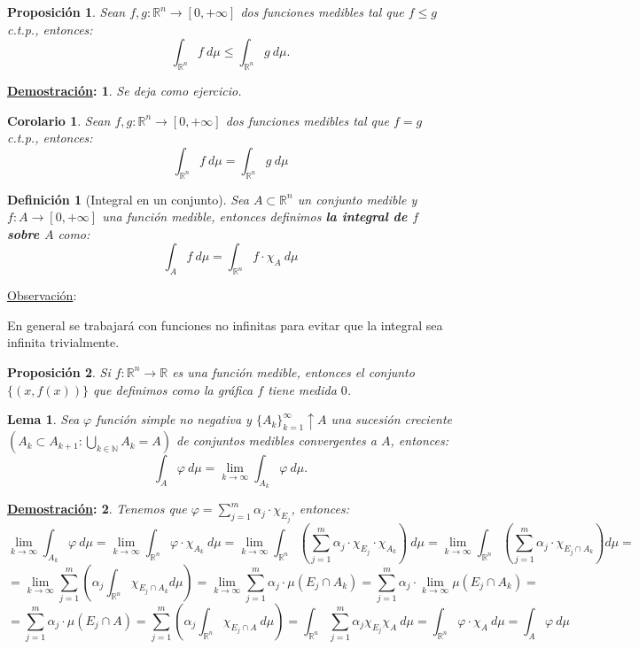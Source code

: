 \documentclass[10pt,a4paper,openright]{book}
\theoremstyle{break}
\newtheorem*{defi}{Definición}
\newtheorem*{coro}{Corolario}
\newtheorem*{lema}{Lema}
\newtheorem*{prop}{Proposición}
\newtheorem*{demo}{\underline{Demostración}:}
\begin{document}
\begin{prop}
Sean $f, g: \mathbb{R}^n \rightarrow \left[0, +\infty\right]$ dos funciones medibles tal que $f \le g$ c.t.p., entonces:
$$\int_{\mathbb{R}^n}f \ d \mu \le \int_{\mathbb{R}^n}g \ d \mu.$$
\end{prop}
\begin{demo}
Se deja como ejercicio.
\end{demo}

\begin{coro}
Sean $f, g: \mathbb{R}^n \rightarrow \left[0, +\infty\right]$ dos funciones medibles tal que $f = g$ c.t.p., entonces:
$$\int_{\mathbb{R}^n}f \ d \mu = \int_{\mathbb{R}^n} g \ d \mu$$
\end{coro}

\begin{defi}[Integral en un conjunto]
Sea $A \subset \mathbb{R}^n$ un conjunto medible y $f: A \rightarrow \left[0, +\infty\right]$ una función medible, entonces definimos \textbf{la integral de $f$ sobre $A$} como:
$$\int_A f \ d \mu = \int_{\mathbb{R}^n}f \cdot \chi_{A} \ d \mu$$
\end{defi}

\underline{Observación}:

En general se trabajará con funciones no infinitas para evitar que la integral sea infinita trivialmente.

\begin{prop}
Si $f:\mathbb{R}^n\rightarrow \mathbb{R}$ es una función medible, entonces el conjunto $\{(x, f(x))\}$ que definimos como la gráfica $f$ tiene medida $0$.
\end{prop}

\begin{lema}
Sea $\varphi$ función simple no negativa y $\{A_k\}_{k=1}^{\infty}\uparrow A$ una sucesión creciente $\left(A_k \subset A_{k+1} : \bigcup_{k \in \mathbb{N}} A_k = A\right)$ de conjuntos medibles convergentes a $A$, entonces:
$$\int_A \varphi \ d \mu = \lim_{k\rightarrow\infty} \int_{A_k} \varphi \ d \mu.$$
\end{lema}
\begin{demo}
Tenemos que $\varphi = \sum_{j=1}^{m} \alpha_j \cdot \chi_{E_j}$, entonces:
$$\lim_{k\rightarrow\infty} \int_{A_k} \varphi \ d \mu = \lim_{k\rightarrow\infty} \int_{\mathbb{R}^n}\varphi \cdot \chi_{A_k} \ d \mu = \lim_{k\rightarrow\infty} \int_{\mathbb{R}^n} \left(\sum_{j=1}^{m} \alpha_j \cdot \chi_{E_j}\cdot \chi_{A_k}\right) \ d \mu= \lim_{k\rightarrow\infty} \int_{\mathbb{R}^n} \left(\sum_{j=1}^{m} \alpha_j \cdot \chi_{E_j \cap A_k}\right) d \mu = $$
$$= \lim_{k\rightarrow\infty} \sum_{j=1}^{m} \left( \alpha_j \int_{\mathbb{R}^n} \chi_{E_j \cap A_k} d \mu \right) = \lim_{k\rightarrow\infty} \sum_{j=1}^{m} \alpha_j \cdot \mu\left(E_j \cap A_k\right) = \sum_{j=1}^{m} \alpha_j \cdot \lim_{k\rightarrow\infty} \mu\left(E_j \cap A_k\right) = $$
$$= \sum_{j=1}^{m} \alpha_j \cdot \mu\left(E_j \cap A\right) = \sum_{j=1}^{m} \left(\alpha_j \int_{\mathbb{R}^n} \chi_{E_j \cap A} \ d \mu\right) = \int_{\mathbb{R}^n}\sum_{j=1}^{m} \alpha_j \chi_{E_j} \chi_{A} \ d \mu= \int_{\mathbb{R}^n} \varphi \cdot \chi_A \ d \mu = \int_A \varphi \ d \mu$$
\end{demo}
\end{document}
